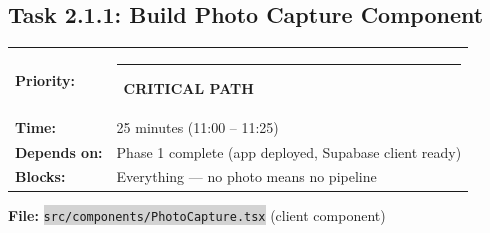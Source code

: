 \documentclass[11pt, a4paper]{article}
\newcommand{\critical}{\textcolor{critred}{\rule{6pt}{6pt}}~\textcolor{critred}{\scriptsize\textbf{CRITICAL PATH}}}
\newcommand{\code}[1]{\texttt{\small\colorbox{lightgray}{#1}}}
\begin{document}
\subsection{Task 2.1.1: Build Photo Capture Component}

\begin{tabularx}{\textwidth}{lX}
\textbf{Priority:} & \critical \\
\textbf{Time:} & 25 minutes (11:00 -- 11:25) \\
\textbf{Depends on:} & Phase 1 complete (app deployed, Supabase client ready) \\
\textbf{Blocks:} & Everything --- no photo means no pipeline \\
\end{tabularx}

\vspace{0.3em}

\textbf{File:} \code{src/components/PhotoCapture.tsx} (client component)
\end{document}
